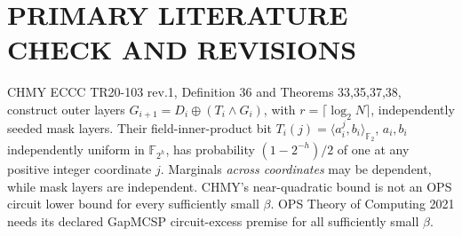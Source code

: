 \documentclass[11pt]{article}
\begin{document}
\section*{PRIMARY LITERATURE CHECK AND REVISIONS}
CHMY ECCC TR20-103 rev.1, Definition 36 and Theorems 33,35,37,38, construct outer layers $G_{i+1}=D_i\oplus(T_i\wedge G_i)$, with $r=\lceil\log_2 N\rceil$, independently seeded mask layers. Their field-inner-product bit $T_i(j)=\langle a_i^j,b_i\rangle_{\mathbb F_2}$, $a_i,b_i$ independently uniform in $\mathbb F_{2^h}$, has probability $(1-2^{-h})/2$ of one at any positive integer coordinate $j$. Marginals \emph{across coordinates} may be dependent, while mask layers are independent. CHMY's near-quadratic bound is not an OPS circuit lower bound for every sufficiently small $\beta$. OPS Theory of Computing 2021 needs its declared GapMCSP circuit-excess premise for all sufficiently small $\beta$.
\end{document}

